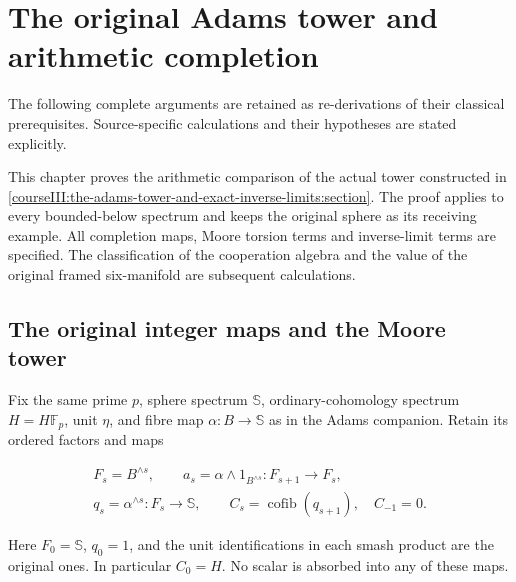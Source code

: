 \section{The original Adams tower and arithmetic completion}\label{courseIII:the-original-adams-tower-and-arithmetic-completion:section}

The following complete arguments are retained as re-derivations of their classical prerequisites. Source-specific calculations and their hypotheses are stated explicitly.

This chapter proves the arithmetic comparison of the actual tower constructed in \cref{courseIII:the-adams-tower-and-exact-inverse-limits:section}. The proof applies to every bounded-below spectrum and keeps the original sphere as its receiving example. All completion maps, Moore torsion terms and inverse-limit terms are specified. The classification of the cooperation algebra and the value of the original framed six-manifold are subsequent calculations.

\subsection{The original integer maps and the Moore tower}
\label{courseIII:the-original-adams-tower-and-arithmetic-completion:arithmetic-moore-tower}

\label{courseIII:the-original-adams-tower-and-arithmetic-completion:section-1}\label{courseIII:adams-arithmetic:1}

Fix the same prime \(p\), sphere spectrum \(\mathbb S\), ordinary-cohomology spectrum \(H=H\mathbb F_p\), unit \(\eta\), and fibre map \(\alpha:B\to\mathbb S\) as in the Adams companion. Retain its ordered factors and maps

\begin{equation}
\begin{gathered}
F_s=B^{\wedge s},\qquad
a_s=\alpha\wedge1_{B^{\wedge s}}:F_{s+1}\longrightarrow F_s,\\
q_s=\alpha^{\wedge s}:F_s\longrightarrow\mathbb S,
\qquad C_s=\operatorname{cofib}(q_{s+1}),\quad C_{-1}=0.
\end{gathered}
\label{courseIII:the-original-adams-tower-and-arithmetic-completion:eq:1.1}
\end{equation}

Here \(F_0=\mathbb S\), \(q_0=1\), and the unit identifications in each smash product are the original ones. In particular \(C_0=H\). No scalar is absorbed into any of these maps.

